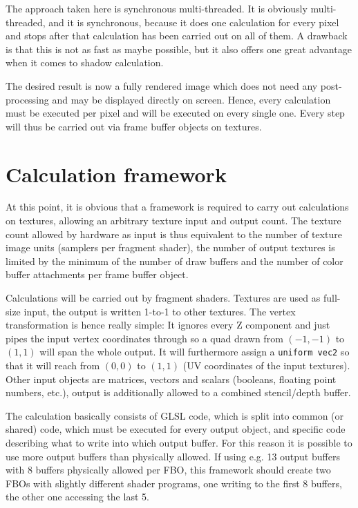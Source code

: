\documentclass[english,fleqn,10pt,twocolumn]{article}
\begin{document}
The approach taken here is synchronous multi-threaded. It is obviously multi-threaded, and it is synchronous, because it does one calculation for every pixel and stops after that calculation has been carried out on all of them. A
drawback is that this is not as fast as maybe possible, but it also offers one great advantage when it comes to shadow calculation.

The desired result is now a fully rendered image which does not need any post-processing and may be displayed directly on screen. Hence, every calculation must be executed per pixel and will be executed on every single one.
Every step will thus be carried out via frame buffer objects on textures.


\section{Calculation framework}

At this point, it is obvious that a framework is required to carry out calculations on textures, allowing an arbitrary texture input and output count. The texture count allowed by hardware as input is thus equivalent to the number of
texture image units (samplers per fragment shader), the number of output textures is limited by the minimum of the number of draw buffers and the number of color buffer attachments per frame buffer object.

Calculations will be carried out by fragment shaders. Textures are used as full-size input, the output is written 1-to-1 to other textures. The vertex transformation is hence really simple: It ignores every Z component and just pipes
the input vertex coordinates through so a quad drawn from $(-1, -1)$ to $(1, 1)$ will span the whole output. It will furthermore assign a {\tt uniform vec2} so that it will reach from $(0, 0)$ to $(1, 1)$ (UV coordinates of the input
textures). Other input objects are matrices, vectors and scalars (booleans, floating point numbers, etc.), output is additionally allowed to a combined stencil/depth buffer.

The calculation basically consists of GLSL code, which is split into common (or shared) code, which must be executed for every output object, and specific code describing what to write into which output buffer. For this reason it is
possible to use more output buffers than physically allowed. If using e.g. 13 output buffers with 8 buffers physically allowed per FBO, this framework should create two FBOs with slightly different shader programs, one writing to the
first 8 buffers, the other one accessing the last 5.
\end{document}
